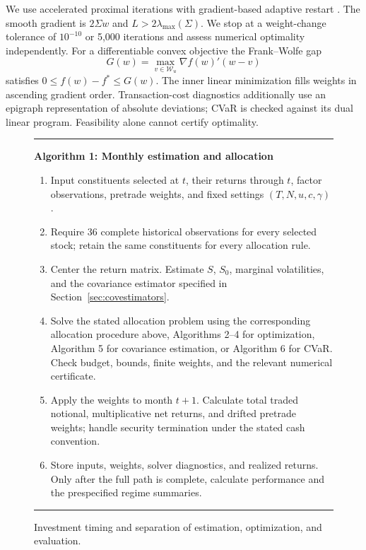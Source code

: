 \documentclass[letterpaper,journal]{IEEEtran}
\begin{document}
We use accelerated proximal iterations \cite{fista} with gradient-based adaptive restart \cite{restart}. The smooth gradient is $2\Sigma w$ and $L>2\lambda_{\max}(\Sigma)$. We stop at a weight-change tolerance of $10^{-10}$ or 5,000 iterations and assess numerical optimality independently. For a differentiable convex objective the Frank--Wolfe gap
\begin{equation}\label{eq:gap}
 G(w)=\max_{v\in\mathcal W_u}\nabla f(w)'(w-v)
\end{equation}
satisfies $0\leq f(w)-f^*\leq G(w)$. The inner linear minimization fills weights in ascending gradient order. Transaction-cost diagnostics additionally use an epigraph representation of absolute deviations; CVaR is checked against its dual linear program. Feasibility alone cannot certify optimality.

\begin{figure}[t]\centering
\begin{minipage}{0.96\textwidth}\hrule\smallskip
\textbf{Algorithm 1: Monthly estimation and allocation}\smallskip
\begin{enumerate}\setlength{\itemsep}{1pt}
\item Input constituents selected at $t$, their returns through $t$, factor observations, pretrade weights, and fixed settings $(T,N,u,c,\gamma)$.
\item Require 36 complete historical observations for every selected stock; retain the same constituents for every allocation rule.
\item Center the return matrix. Estimate $S$, $S_0$, marginal volatilities, and the covariance estimator specified in Section~\ref{sec:covestimators}.
\item Solve the stated allocation problem using the corresponding allocation procedure above, Algorithms 2--4 for optimization, Algorithm 5 for covariance estimation, or Algorithm 6 for CVaR. Check budget, bounds, finite weights, and the relevant numerical certificate.
\item Apply the weights to month $t+1$. Calculate total traded notional, multiplicative net returns, and drifted pretrade weights; handle security termination under the stated cash convention.
\item Store inputs, weights, solver diagnostics, and realized returns. Only after the full path is complete, calculate performance and the prespecified regime summaries.
\end{enumerate}\hrule
\end{minipage}
\caption{Investment timing and separation of estimation, optimization, and evaluation.}\label{alg:monthly}
\end{figure}
\end{document}
